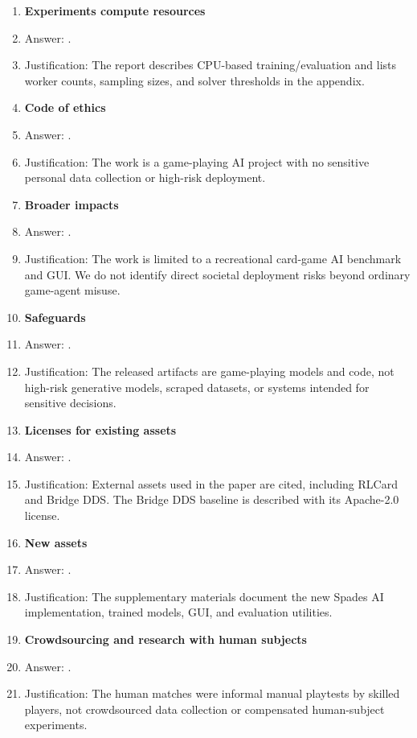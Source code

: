 \documentclass{article}
\begin{document}
\begin{enumerate}
\item {\bf Experiments compute resources}
    \item[] Answer: \answerYes{}.
    \item[] Justification: The report describes CPU-based training/evaluation and lists worker counts, sampling sizes, and solver thresholds in the appendix.

\item {\bf Code of ethics}
    \item[] Answer: \answerYes{}.
    \item[] Justification: The work is a game-playing AI project with no sensitive personal data collection or high-risk deployment.

\item {\bf Broader impacts}
    \item[] Answer: \answerNA{}.
    \item[] Justification: The work is limited to a recreational card-game AI benchmark and GUI. We do not identify direct societal deployment risks beyond ordinary game-agent misuse.

\item {\bf Safeguards}
    \item[] Answer: \answerNA{}.
    \item[] Justification: The released artifacts are game-playing models and code, not high-risk generative models, scraped datasets, or systems intended for sensitive decisions.

\item {\bf Licenses for existing assets}
    \item[] Answer: \answerYes{}.
    \item[] Justification: External assets used in the paper are cited, including RLCard and Bridge DDS. The Bridge DDS baseline is described with its Apache-2.0 license.

\item {\bf New assets}
    \item[] Answer: \answerYes{}.
    \item[] Justification: The supplementary materials document the new Spades AI implementation, trained models, GUI, and evaluation utilities.

\item {\bf Crowdsourcing and research with human subjects}
    \item[] Answer: \answerNA{}.
    \item[] Justification: The human matches were informal manual playtests by skilled players, not crowdsourced data collection or compensated human-subject experiments.


\end{enumerate}
\end{document}
